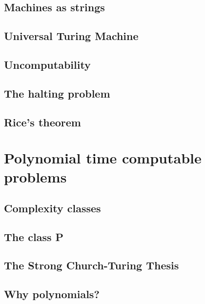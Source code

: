 \documentclass[12pt,a4paper,oneside]{book}
\begin{document}
\section{Machines as strings}

\label{s_2_6}

\section{Universal Turing Machine}

\label{s_2_7}

\section{Uncomputability}

\label{s_2_8}

\section{The halting problem}

\label{s_2_9}

\section{Rice's theorem}

\label{s_2_10}

\chapter{Polynomial time computable problems}
\label{c_3}

\section{Complexity classes}

\label{s_3_1}

\section{The class P}

\label{s_3_2}

\section{The Strong Church-Turing Thesis}

\label{s_3_3}

\section{Why polynomials?}

\label{s_3_4}
\end{document}
